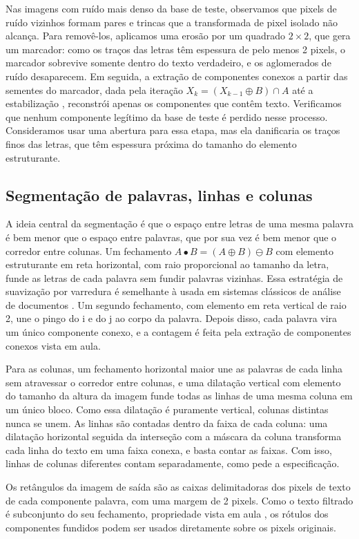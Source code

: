 \documentclass[12pt, a4paper]{article}
\begin{document}
Nas imagens com ruído mais denso da base de teste, observamos que pixels de ruído vizinhos formam pares e trincas que a transformada de pixel isolado não alcança. Para removê-los, aplicamos uma erosão por um quadrado $2 \times 2$, que gera um marcador: como os traços das letras têm espessura de pelo menos 2 pixels, o marcador sobrevive somente dentro do texto verdadeiro, e os aglomerados de ruído desaparecem. Em seguida, a extração de componentes conexos a partir das sementes do marcador, dada pela iteração $X_k = (X_{k-1} \oplus B) \cap A$ até a estabilização \cite{b1, b2}, reconstrói apenas os componentes que contêm texto. Verificamos que nenhum componente legítimo da base de teste é perdido nesse processo. Consideramos usar uma abertura para essa etapa, mas ela danificaria os traços finos das letras, que têm espessura próxima do tamanho do elemento estruturante.

\subsection{Segmentação de palavras, linhas e colunas}
A ideia central da segmentação é que o espaço entre letras de uma mesma palavra é bem menor que o espaço entre palavras, que por sua vez é bem menor que o corredor entre colunas. Um fechamento $A \bullet B = (A \oplus B) \ominus B$ com elemento estruturante em reta horizontal, com raio proporcional ao tamanho da letra, funde as letras de cada palavra sem fundir palavras vizinhas. Essa estratégia de suavização por varredura é semelhante à usada em sistemas clássicos de análise de documentos \cite{b4}. Um segundo fechamento, com elemento em reta vertical de raio 2, une o pingo do i e do j ao corpo da palavra. Depois disso, cada palavra vira um único componente conexo, e a contagem é feita pela extração de componentes conexos vista em aula.

Para as colunas, um fechamento horizontal maior une as palavras de cada linha sem atravessar o corredor entre colunas, e uma dilatação vertical com elemento do tamanho da altura da imagem funde todas as linhas de uma mesma coluna em um único bloco. Como essa dilatação é puramente vertical, colunas distintas nunca se unem. As linhas são contadas dentro da faixa de cada coluna: uma dilatação horizontal seguida da interseção com a máscara da coluna transforma cada linha do texto em uma faixa conexa, e basta contar as faixas. Com isso, linhas de colunas diferentes contam separadamente, como pede a especificação.

Os retângulos da imagem de saída são as caixas delimitadoras dos pixels de texto de cada componente palavra, com uma margem de 2 pixels. Como o texto filtrado é subconjunto do seu fechamento, propriedade vista em aula \cite{b1}, os rótulos dos componentes fundidos podem ser usados diretamente sobre os pixels originais.
\end{document}
